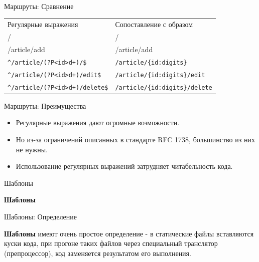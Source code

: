 \begin{frame}[fragile]{Маршруты: Сравнение}

  \begin{table}[]
  \centering
  \label{my-label}
  \begin{tabular}{ll}
    Регулярные выражения & Сопоставление с образом \\
    / & / \\
    /article/add & /article/add \\
    \verb|^/article/(?P<id>d+)/$|       & \verb|/article/{id:digits}|      \\
    \verb|^/article/(?P<id>d+)/edit$|   & \verb|/article/{id:digits}/edit| \\
    \verb|^/article/(?P<id>d+)/delete$| & \verb|/article/{id:digits}/delete|

  \end{tabular}
  \end{table}

\end{frame}

\begin{frame}{Маршруты: Преимущества}

  \begin{itemize}
    \item
      Регулярные выражения дают огромные возможности.
    \item
      Но из-за ограничений \newline
      описанных в стандарте RFC 1738,
      большинство из них не нужны.
    \item
      Использование регулярных выражений затрудняет читабельность кода.
  \end{itemize}

\end{frame}


\begin{frame}{Шаблоны}

  \textbf{Шаблоны}

\end{frame}


\begin{frame}{Шаблоны: Определение}

  \textbf{Шаблоны} имеют очень простое определение - в статические файлы вставляются
  куски кода, при прогоне таких файлов через специальный транслятор
  (препроцессор), код заменяется результатом его выполнения.

\end{frame}


